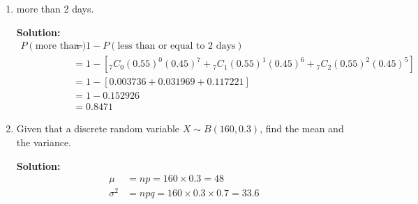 \documentclass{report}
\newcommand{\sol}{\textbf{Solution:}}
\newcommand\comb[2][^n]{{}_{#1}C_{#2}}
\begin{document}
\begin{enumerate}[leftmargin=*]
\begin{enumerate}
              \item more than 2 days.

                    \sol{}
                    \begin{align*}
                        P(\text{more than 2 days}) & = 1 - P(\text{less than or equal to 2 days})                                                               \\
                                                   & = 1 - \left[\comb[7]{0}(0.55)^0(0.45)^7 + \comb[7]{1}(0.55)^1(0.45)^6 + \comb[7]{2}(0.55)^2(0.45)^5\right] \\
                                                   & = 1 - \left[0.003736 + 0.031969 + 0.117221\right]                                                          \\
                                                   & = 1 - 0.152926                                                                                             \\
                                                   & = 0.8471
                    \end{align*}

              \item Given that a discrete random variable $X \sim B(160, 0.3)$, find the mean and
                    the variance.

                    \sol{}
                    \begin{align*}
                        \mu      & = np = 160 \times 0.3 = 48               \\
                        \sigma^2 & = npq = 160 \times 0.3 \times 0.7 = 33.6
                    \end{align*}
          \end{enumerate}


\end{enumerate}
\end{document}
